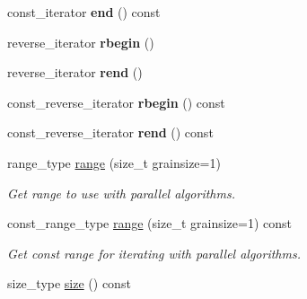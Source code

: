 \begin{DoxyCompactItemize}
\item 
\hypertarget{classtbb_1_1concurrent__vector_ad91509b4585928abc7eac70e9b239eab}{}const\+\_\+iterator {\bfseries end} () const \label{classtbb_1_1concurrent__vector_ad91509b4585928abc7eac70e9b239eab}

\item 
\hypertarget{classtbb_1_1concurrent__vector_a73bc5d939d0438330beca9f8391e6405}{}reverse\+\_\+iterator {\bfseries rbegin} ()\label{classtbb_1_1concurrent__vector_a73bc5d939d0438330beca9f8391e6405}

\item 
\hypertarget{classtbb_1_1concurrent__vector_ab47823891cbd0fa88ae8a7f9912aa7c6}{}reverse\+\_\+iterator {\bfseries rend} ()\label{classtbb_1_1concurrent__vector_ab47823891cbd0fa88ae8a7f9912aa7c6}

\item 
\hypertarget{classtbb_1_1concurrent__vector_ab49b41b70054da3d278de0a4e75dc2f4}{}const\+\_\+reverse\+\_\+iterator {\bfseries rbegin} () const \label{classtbb_1_1concurrent__vector_ab49b41b70054da3d278de0a4e75dc2f4}

\item 
\hypertarget{classtbb_1_1concurrent__vector_aaa47ddf4383a4d5fe9d748eaa7d57e43}{}const\+\_\+reverse\+\_\+iterator {\bfseries rend} () const \label{classtbb_1_1concurrent__vector_aaa47ddf4383a4d5fe9d748eaa7d57e43}

\item 
\hypertarget{classtbb_1_1concurrent__vector_a6c6a75852f0619ae3ed382673abf4055}{}range\+\_\+type \hyperlink{classtbb_1_1concurrent__vector_a6c6a75852f0619ae3ed382673abf4055}{range} (size\+\_\+t grainsize=1)\label{classtbb_1_1concurrent__vector_a6c6a75852f0619ae3ed382673abf4055}

\begin{DoxyCompactList}\small\item\em Get range to use with parallel algorithms. \end{DoxyCompactList}\item 
\hypertarget{classtbb_1_1concurrent__vector_af9f4b6010310b4e6780ed77384f74e85}{}const\+\_\+range\+\_\+type \hyperlink{classtbb_1_1concurrent__vector_af9f4b6010310b4e6780ed77384f74e85}{range} (size\+\_\+t grainsize=1) const \label{classtbb_1_1concurrent__vector_af9f4b6010310b4e6780ed77384f74e85}

\begin{DoxyCompactList}\small\item\em Get const range for iterating with parallel algorithms. \end{DoxyCompactList}\item 
\hypertarget{classtbb_1_1concurrent__vector_a6cac13e24ff09a230f543ff5f523ee7c}{}size\+\_\+type \hyperlink{classtbb_1_1concurrent__vector_a6cac13e24ff09a230f543ff5f523ee7c}{size} () const \label{classtbb_1_1concurrent__vector_a6cac13e24ff09a230f543ff5f523ee7c}


\end{DoxyCompactItemize}
